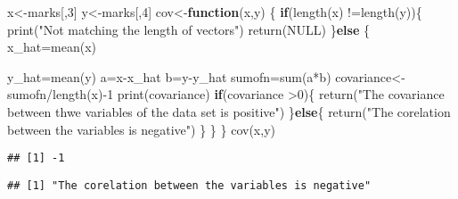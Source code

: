 \documentclass[
]{article}
\newenvironment{Shaded}{\begin{snugshade}}{\end{snugshade}}
\newcommand{\ConstantTok}[1]{\textcolor[rgb]{0.00,0.00,0.00}{#1}}
\newcommand{\ControlFlowTok}[1]{\textcolor[rgb]{0.13,0.29,0.53}{\textbf{#1}}}
\newcommand{\DecValTok}[1]{\textcolor[rgb]{0.00,0.00,0.81}{#1}}
\newcommand{\FunctionTok}[1]{\textcolor[rgb]{0.00,0.00,0.00}{#1}}
\newcommand{\NormalTok}[1]{#1}
\newcommand{\OtherTok}[1]{\textcolor[rgb]{0.56,0.35,0.01}{#1}}
\newcommand{\SpecialCharTok}[1]{\textcolor[rgb]{0.00,0.00,0.00}{#1}}
\newcommand{\StringTok}[1]{\textcolor[rgb]{0.31,0.60,0.02}{#1}}
\begin{document}
\begin{Shaded}
\begin{Highlighting}[]
\NormalTok{x}\OtherTok{\textless{}{-}}\NormalTok{marks[,}\DecValTok{3}\NormalTok{]}
\NormalTok{y}\OtherTok{\textless{}{-}}\NormalTok{marks[,}\DecValTok{4}\NormalTok{]}
\NormalTok{cov}\OtherTok{\textless{}{-}}\ControlFlowTok{function}\NormalTok{(x,y) \{}
  \ControlFlowTok{if}\NormalTok{(}\FunctionTok{length}\NormalTok{(x) }\SpecialCharTok{!=}\FunctionTok{length}\NormalTok{(y))\{}
    \FunctionTok{print}\NormalTok{(}\StringTok{"Not matching the length of vectors"}\NormalTok{)}
    \FunctionTok{return}\NormalTok{(}\ConstantTok{NULL}\NormalTok{)}
\NormalTok{  \}}\ControlFlowTok{else}\NormalTok{ \{}
\NormalTok{    x\_hat}\OtherTok{=}\FunctionTok{mean}\NormalTok{(x)}
    
\NormalTok{    y\_hat}\OtherTok{=}\FunctionTok{mean}\NormalTok{(y)}
\NormalTok{    a}\OtherTok{=}\NormalTok{x}\SpecialCharTok{{-}}\NormalTok{x\_hat}
\NormalTok{    b}\OtherTok{=}\NormalTok{y}\SpecialCharTok{{-}}\NormalTok{y\_hat}
\NormalTok{    sumofn}\OtherTok{=}\FunctionTok{sum}\NormalTok{(a}\SpecialCharTok{*}\NormalTok{b)}
\NormalTok{    covariance}\OtherTok{\textless{}{-}}\NormalTok{sumofn}\SpecialCharTok{/}\FunctionTok{length}\NormalTok{(x)}\SpecialCharTok{{-}}\DecValTok{1}
    \FunctionTok{print}\NormalTok{(covariance)}
    \ControlFlowTok{if}\NormalTok{(covariance }\SpecialCharTok{\textgreater{}}\DecValTok{0}\NormalTok{)\{}
      \FunctionTok{return}\NormalTok{(}\StringTok{"The covariance between thwe variables of the data set is positive"}\NormalTok{)}
\NormalTok{    \}}\ControlFlowTok{else}\NormalTok{\{}
      \FunctionTok{return}\NormalTok{(}\StringTok{"The corelation between the variables is negative"}\NormalTok{)}
\NormalTok{    \}}
\NormalTok{  \}}
\NormalTok{\}}
\FunctionTok{cov}\NormalTok{(x,y)}
\end{Highlighting}
\end{Shaded}

\begin{verbatim}
## [1] -1
\end{verbatim}

\begin{verbatim}
## [1] "The corelation between the variables is negative"
\end{verbatim}
\end{document}
